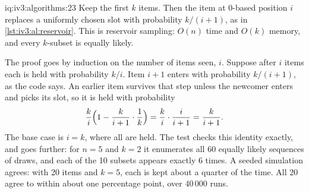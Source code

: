\begin{solution}{iq:iv3:algorithms:23}
Keep the first $k$ items. Then the item at 0-based position $i$ replaces a uniformly chosen slot with probability $k/(i+1)$, as in \cref{lst:iv3:al:reservoir}. This is reservoir sampling: $O(n)$ time and $O(k)$ memory, and every $k$-subset is equally likely.
\label{lst:iv3:al:reservoir}

The proof goes by induction on the number of items seen, $i$. Suppose after $i$ items each is held with probability $k/i$. Item $i+1$ enters with probability $k/(i+1)$, as the code says. An earlier item survives that step unless the newcomer enters and picks its slot, so it is held with probability
\[
\frac{k}{i}\Bigl(1 - \frac{k}{i+1} \cdot \frac{1}{k}\Bigr) = \frac{k}{i} \cdot \frac{i}{i+1} = \frac{k}{i+1}.
\]
The base case is $i = k$, where all are held. The test checks this identity exactly, and goes further: for $n = 5$ and $k = 2$ it enumerates all 60 equally likely sequences of draws, and each of the 10 subsets appears exactly 6 times. A seeded simulation agrees: with 20 items and $k = 5$, each is kept about a quarter of the time. All 20 agree to within about one percentage point, over 40\,000 runs.

\end{solution}

